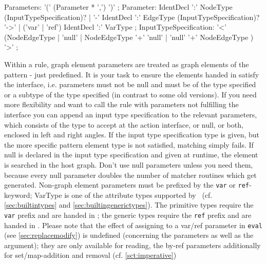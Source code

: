 \begin{rail}
  Parameters: '(' (Parameter * ',') ')' ;
  Parameter: IdentDecl ':' NodeType (InputTypeSpecification)? | '-' IdentDecl ':' EdgeType (InputTypeSpecification)? '->' | ('var' | 'ref') IdentDecl ':' VarType ;
  InputTypeSpecification: '<' (NodeEdgeType | 'null' | NodeEdgeType '+' 'null' | 'null' '+' NodeEdgeType ) '>' ;
\end{rail}

Within a rule, graph element parameters are treated as graph elements of the pattern - just predefined.
It is your task to ensure the elements handed in satisfy the interface, i.e. parameters must not be null and must be of the type specified or a subtype of the type specified (in contrast to some old versions).
If you need more flexibility and want to call the rule with parameters not fulfilling the interface you can append an input type specification to the relevant parameters, which consists of the type to accept at the action interface, or null, or both, enclosed in left and right angles.
If the input type specification type is given, but the more specific pattern element type is not satisfied, matching simply fails.
If null is declared in the input type specification and given at runtime, the element is searched in the host graph.
Don't use null parameters unless you need them, because every null parameter doubles the number of matcher routines which get generated.
Non-graph element parameters must be prefixed by the \texttt{var} or \texttt{ref}-keyword;
VarType is one of the attribute types supported by \GrG\ (cf. \ref{sec:builtintypes} and \ref{sec:builtingenerictypes}).
The primitive types require the \texttt{var} prefix and are handed in ;
the generic types require the \texttt{ref} prefix and are handed in .
Please note that the effect of assigning to a var/ref parameter in \texttt{eval} (see \ref{sec:replacemodify}) is undefined (concerning the parameters as well as the argument);
they are only available for reading, the by-ref parameters additionally for set/map-addition and removal (cf. \ref{sct:imperative})

